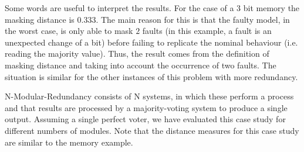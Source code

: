 Some words are useful to interpret the results. For the case of a $3$ bit memory the masking distance is $0.333$. The main reason for this is that the faulty model, in the worst case, is only able to mask $2$ faults (in this example, a fault is an unexpected change of a bit) before failing to replicate the nominal behaviour (i.e. reading the majority value). Thus, the result comes from the definition of masking distance and taking into account the occurrence of two faults. The situation is similar for the other instances of this problem with more redundancy.

N-Modular-Redundancy consists of N systems, in which these perform a process and that results are processed by a majority-voting system to produce a single output. 
Assuming a single perfect voter, we have evaluated this case study for different numbers of modules.
Note that the distance measures for this case study are similar to the memory example. 


